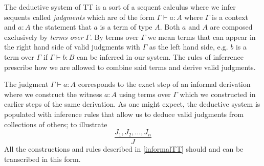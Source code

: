 \documentclass[12pt]{report}
\theoremstyle{definition}
\begin{document}
The deductive system of TT is a sort of a sequent calculus where we infer sequents called \textit{judgments} which are of the form $\Gamma \vdash a : A$ where $\Gamma$ is a context and $a : A$ the statement that $a$ is a term of type $A$. 
Both $a$ and $A$ are composed exclusively by \textit{terms over} $\Gamma$. 
By terms over $\Gamma$ we mean terms that can appear in the right hand side of valid judgments with $\Gamma$ as the left hand side, e.g. $b$ is a term over $\Gamma$ if $\Gamma \vdash b : B$ can be inferred in our system. 
The rules of inferrence prescribe how we are allowed to combine said terms and derive valid judgments. 

The judgment $\Gamma \vdash a  : A$ corresponds to the exact step of an informal derivation where we construct the witness $a : A$ using terms over $\Gamma$ which we constructed in earlier steps of the same derivation. 
As one might expect, the deductive system is populated with inference rules that allow us to deduce valid judgments from collections of others; to illustrate
$$\frac{J_1,J_2,\ldots,J_n}{J}$$
All the constructions and rules described in \ref{informalTT} should and can be transcribed in this form.
\end{document}
